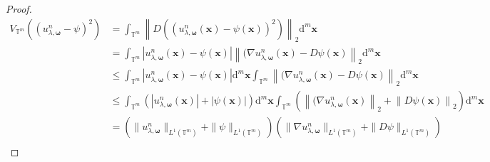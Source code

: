\documentclass[multixcb]{amstext-l}
\theoremstyle{plain}
\theoremstyle{definition}
\theoremstyle{definition}
\theoremstyle{remark}
\numberwithin{equation}{chapter}
\begin{document}
\begin{proof}
\begin{equation}\label{moon_mars}
    \begin{aligned}
    V_{\mathbb{T}^m}((u_{\lambda,\boldsymbol{\omega}}^n - \psi)^2) &= \int_{\mathbb{T}^m}\left\|D\left(    (u_{\lambda,\boldsymbol{\omega}}^n(\boldsymbol{x}) - \psi(\boldsymbol{x}))^2 \right)\right\|_2\mathrm{d}^m\boldsymbol{x}\\
    &= \int_{\mathbb{T}^m}\left|u_{\lambda,\boldsymbol{\omega}}^n(\boldsymbol{x}) - \psi(\boldsymbol{x})\right|\left\|(\nabla u_{\lambda,\boldsymbol{\omega}}^n(\boldsymbol{x}) - D\psi(\boldsymbol{x})\right\|_2 \mathrm{d}^m\boldsymbol{x}\\
    &\le \int_{\mathbb{T}^m}\left|u_{\lambda,\boldsymbol{\omega}}^n(\boldsymbol{x}) - \psi(\boldsymbol{x})\right|\mathrm{d}^m\boldsymbol{x}\int_{\mathbb{T}^m}\left\|(\nabla u_{\lambda,\boldsymbol{\omega}}^n(\boldsymbol{x}) - D\psi(\boldsymbol{x})\right\|_2 \mathrm{d}^m\boldsymbol{x}\\
    &\le \int_{\mathbb{T}^m}\left(\left|u_{\lambda,\boldsymbol{\omega}}^n(\boldsymbol{x})\right| + \left|\psi(\boldsymbol{x})\right|\right)\mathrm{d}^m\boldsymbol{x}\int_{\mathbb{T}^m}\left(\left\|(\nabla u_{\lambda,\boldsymbol{\omega}}^n(\boldsymbol{x})\right\|_2 + \left\| D\psi(\boldsymbol{x})\right\|_2\right) \mathrm{d}^m\boldsymbol{x}\\
    &= \left(\|u_{\lambda,\boldsymbol{\omega}}^n\|_{L^1(\mathbb{T}^m)} + \|\psi\|_{L^1(\mathbb{T}^m)}  \right) \left(\|\nabla u_{\lambda,\boldsymbol{\omega}}^n\|_{L^1(\mathbb{T}^m)} + \|D \psi\|_{L^1(\mathbb{T}^m)} \right)\\

\end{aligned}
\end{equation}
\end{proof}
\end{document}
